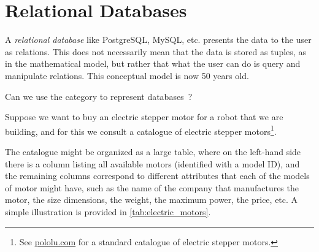 
\section{Relational Databases}
\label{sec:relational-databases}


A \emph{relational database} like PostgreSQL, MySQL, etc. presents
the data to the user as relations. This does not necessarily mean
that the data is stored as tuples, as in the mathematical model, but
rather that what the user can do is query and manipulate relations.
This conceptual model is now 50 years old.

Can we use the category \Rel to represent databases~\cite{codd2002relational}?

Suppose we want to buy an electric stepper motor for a robot that we are building, and for this we consult a catalogue of electric stepper motors\footnote{See \href{https://www.pololu.com/category/87/stepper-motors}{pololu.com} for a standard catalogue of electric stepper motors.}.

The catalogue might be organized as a large table, where on the left-hand side there is a column listing all available motors (identified with a model ID), and the remaining columns correspond to different attributes that each of the models of motor might have, such as the name of the company that manufactures the motor, the size dimensions, the weight, the maximum power, the price, etc. A simple illustration is provided in \cref{tab:electric_motors}.

\begin{table}[h]
    \centering
    \caption{A simplified catalogue of motors.}
    \label{tab:electric_motors}
\end{table}


